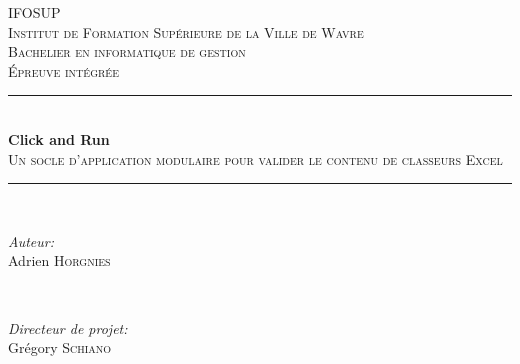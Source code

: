 \begin{titlepage}


    \newcommand{\HRule}{\rule{\linewidth}{0.5mm}} %

    \center


    \textsc{\LARGE IFOSUP}\\[0.5cm]
    \textsc{\large Institut de Formation Supérieure de la Ville de Wavre}\\[1.5cm]
    \textsc{\Large Bachelier en informatique de gestion}\\[0.5cm]
    \textsc{\large Épreuve intégrée}\\[0.5cm]


    \HRule \\[0.4cm]
    { \huge \bfseries Click and Run}\\[0.4cm]
    \textsc{\large Un socle d'application modulaire pour valider le contenu de classeurs Excel}\\[0.5cm]
    \HRule \\[1.5cm]


    \begin{minipage}{0.4\textwidth}
        \begin{flushleft} \large
        \emph{Auteur:}\\
        Adrien \textsc{Horgnies}
        \end{flushleft}
    \end{minipage}
    ~
    \begin{minipage}{0.4\textwidth}
        \begin{flushright} \large
        \emph{Directeur de projet:} \\
        Grégory \textsc{Schiano}
        \end{flushright}
    \end{minipage}\\[2cm]


\end{titlepage}
